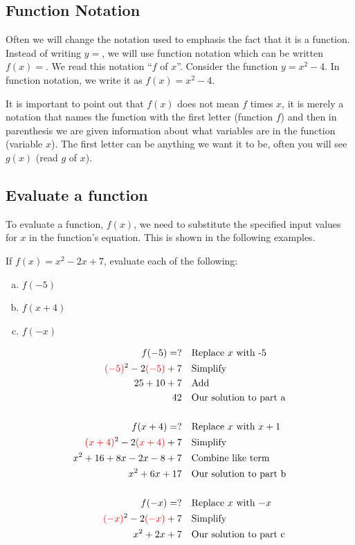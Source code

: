 \subsection{Function Notation}
Often we will change the notation used to
emphasis the fact that it is a function. Instead of writing $y =$, we will use function notation which can be written $f(x) = $. We read this notation “$f$ of $x$”. Consider the function $y=x^2-4$. In function notation, we write it as $f(x)=x^2-4$.
\begin{nt}
It is important to point out that $f(x)$ does not mean
$f$ times $x$, it is merely a notation that names the function with the first letter (function $f$) and then in parenthesis we are given information about what variables
are in the function (variable $x$). The first letter can be anything we want it to be, often you will see $g(x)$ (read $g$ of $x$).
\end{nt}
\subsection{Evaluate a function}
To evaluate a function, $f(x)$, we need to substitute the specified input values for $x$ in the function's equation. This is shown in the following examples.
\begin{exa}
    If $f(x)=x^2-2x+7$, evaluate each of the following:
    \begin{multicols}{3}
    \begin{enumerate}[a.]
        \item $f(-5)$
        \item $f(x+4)$
        \item $f(-x)$
    \end{enumerate}
    \end{multicols}
\end{exa}

\begin{align*}
    f(-5)=?&  &   &\text{Replace $x$ with -5}\\
    \textcolor{red}{(-5)}^2-2\textcolor{red}{(-5)}+7& &   &\text{Simplify}\\
    25+10+7&    &   &\text{Add}\\
    42& &   &\text{Our solution to part a}\\
    &   &   &\\
    f(x+4)=?&     &   &\text{Replace $x$ with $x+1$}\\
    \textcolor{red}{(x+4)}^2-2\textcolor{red}{(x+4)}+7& &   &\text{Simplify}\\
    x^2+16+8x-2x-8+7&   &   &\text{Combine like term}\\
    x^2+6x+17&  &   &\text{Our solution to part b}\\
    &   &   &\\
    f(-x)=?&  &   &\text{Replace $x$ with $-x$}\\
    \textcolor{red}{(-x)}^2-2\textcolor{red}{(-x)}+7& &   &\text{Simplify}\\
    x^2+2x+7&   &   &\text{Our solution to part c}
\end{align*}
